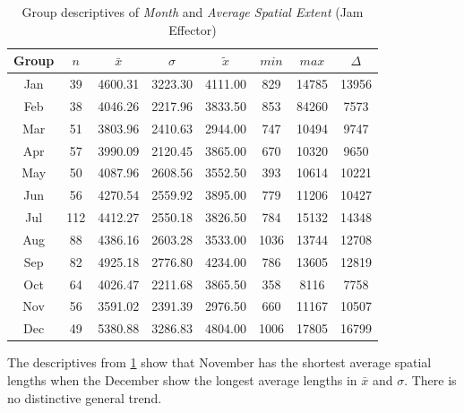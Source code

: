 \begin{table}[ht!]
	\tiny
	\centering
	\begin{tabular}{c|c|c|c|c|c|c|c}
		\toprule
		Group & $n$ & $\bar{x}$ & $\sigma$ & $\tilde{x}$ & $min$ & $max$ & $\Delta$ \\
		\midrule
		Jan & 39  & 4600.31 & 3223.30 & 4111.00 & 829  & 14785 & 13956 \\ 
		Feb & 38  & 4046.26 & 2217.96 & 3833.50 & 853  & 84260 & 7573  \\ 
		Mar & 51  & 3803.96 & 2410.63 & 2944.00 & 747  & 10494 & 9747  \\ 
		Apr & 57  & 3990.09 & 2120.45 & 3865.00 & 670  & 10320 & 9650  \\ 
		May & 50  & 4087.96 & 2608.56 & 3552.50 & 393  & 10614 & 10221 \\ 
		Jun & 56  & 4270.54 & 2559.92 & 3895.00 & 779  & 11206 & 10427 \\ 
		Jul & 112 & 4412.27 & 2550.18 & 3826.50 & 784  & 15132 & 14348 \\ 
		Aug & 88  & 4386.16 & 2603.28 & 3533.00 & 1036 & 13744 & 12708 \\ 
		Sep & 82  & 4925.18 & 2776.80 & 4234.00 & 786  & 13605 & 12819 \\ 
		Oct & 64  & 4026.47 & 2211.68 & 3865.50 & 358  & 8116  & 7758  \\ 
		Nov & 56  & 3591.02 & 2391.39 & 2976.50 & 660  & 11167 & 10507 \\ 
		Dec & 49  & 5380.88 & 3286.83 & 4804.00 & 1006 & 17805 & 16799 \\ 
		\bottomrule
	\end{tabular}
    \caption{Group descriptives of \textit{Month} and \textit{Average Spatial Extent} (Jam Effector)}
    \label{tbl:descriptives_baysis_effector_Month_SAvg}
\end{table}
The descriptives from \cref{tbl:descriptives_baysis_effector_Month_SAvg} show that November has the shortest average spatial lengths when the December show the longest average lengths in $\bar{x}$ and $\sigma$. There is no distinctive general trend.